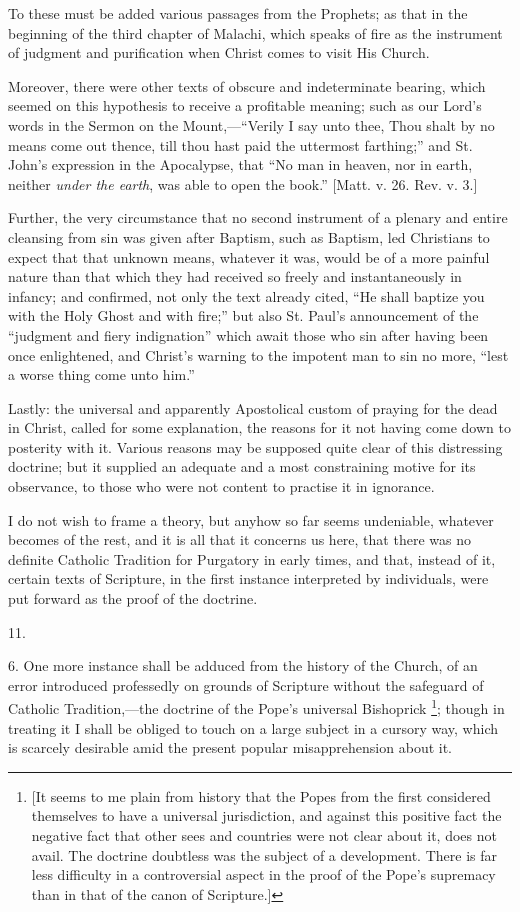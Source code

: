To these must be added various passages from the Prophets; as that
in the beginning of the third chapter of Malachi, which speaks of fire
as the instrument of judgment and purification when Christ comes to
visit His Church.

Moreover, there were other texts of obscure and indeterminate
bearing, which seemed on this hypothesis to receive a profitable
meaning; such as our Lord's words in the Sermon on the Mount,—``Verily
I say unto thee, Thou shalt by no means come out thence, till thou
hast paid the uttermost farthing;'' and St. John's expression in
the Apocalypse, that ``No man in heaven, nor in earth, neither \emph{under
the earth}, was able to open the book.'' [Matt. v. 26. Rev. v.
3.]

Further, the very circumstance that no second instrument of a
plenary and entire cleansing from sin was given after Baptism, such as
Baptism, led Christians to expect that that unknown means, whatever it
was, would be of a more painful nature than that which they had
received so freely and instantaneously in infancy; and confirmed, not
only the text already cited, ``He shall baptize you with the Holy
Ghost and with fire;'' but also St. Paul's announcement of the
``judgment and fiery indignation'' which await those who sin
after having been once enlightened, and Christ's warning to the
impotent man to sin no more, ``lest a worse thing come unto
him.''

Lastly: the universal and apparently Apostolical custom of praying
for the dead in Christ, called for some explanation, the reasons for
it not having come down to posterity with it. Various reasons may be
supposed quite clear of this distressing doctrine; but it supplied an
adequate and a most constraining motive for its observance, to those
who were not content to practise it in ignorance.

I do not wish to frame a theory, but anyhow so far seems
undeniable, whatever becomes of the rest, and it is all that it
concerns us here, that there was no definite Catholic Tradition for
Purgatory in early times, and that, instead of it, certain texts of
Scripture, in the first instance interpreted by individuals, were put
forward as the proof of the doctrine.

11.

6. One more instance shall be adduced from the history of the
Church, of an error introduced professedly on grounds of Scripture
without the safeguard of Catholic Tradition,—the doctrine of the
Pope's universal Bishoprick \footnote{[It seems to me plain from history that
the Popes from the first considered themselves to have a universal
jurisdiction, and against this positive fact the negative fact that
other sees and countries were not clear about it, does not avail. The
doctrine doubtless was the subject of a development. There is far less
difficulty in a controversial aspect in the proof of the Pope's
supremacy than in that of the canon of Scripture.]};
though in treating it I shall be obliged to touch on a large subject
in a cursory way, which is scarcely desirable amid the present popular
misapprehension about it.

